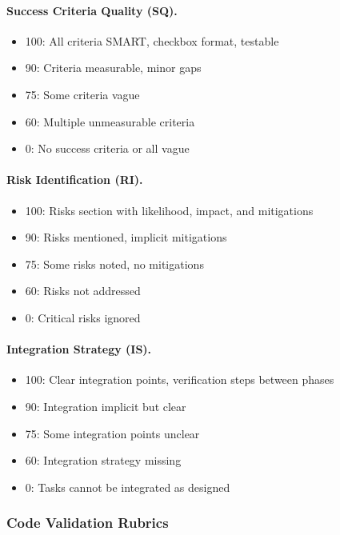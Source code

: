 \paragraph{Success Criteria Quality (SQ).}
\begin{itemize}
    \item 100: All criteria SMART, checkbox format, testable
    \item 90: Criteria measurable, minor gaps
    \item 75: Some criteria vague
    \item 60: Multiple unmeasurable criteria
    \item 0: No success criteria or all vague
\end{itemize}

\paragraph{Risk Identification (RI).}
\begin{itemize}
    \item 100: Risks section with likelihood, impact, and mitigations
    \item 90: Risks mentioned, implicit mitigations
    \item 75: Some risks noted, no mitigations
    \item 60: Risks not addressed
    \item 0: Critical risks ignored
\end{itemize}

\paragraph{Integration Strategy (IS).}
\begin{itemize}
    \item 100: Clear integration points, verification steps between phases
    \item 90: Integration implicit but clear
    \item 75: Some integration points unclear
    \item 60: Integration strategy missing
    \item 0: Tasks cannot be integrated as designed
\end{itemize}

\subsubsection{Code Validation Rubrics}


